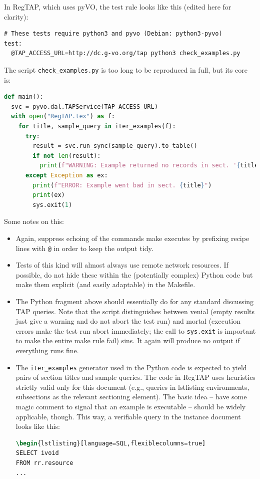 \documentclass[11pt,a4paper]{ivoa}
\begin{document}
In RegTAP, which uses pyVO, the test rule looks like this 
(edited here for clarity):

\begin{lstlisting}[basicstyle=\footnotesize]
# These tests require python3 and pyvo (Debian: python3-pyvo)
test:
  @TAP_ACCESS_URL=http://dc.g-vo.org/tap python3 check_examples.py
\end{lstlisting}

The script \verb|check_examples.py| is too long to be reproduced in
full, but its core is:

\begin{lstlisting}[language=python,basicstyle=\footnotesize]
def main():
  svc = pyvo.dal.TAPService(TAP_ACCESS_URL)
  with open("RegTAP.tex") as f:
    for title, sample_query in iter_examples(f):
      try:
        result = svc.run_sync(sample_query).to_table()
        if not len(result):
          print(f"WARNING: Example returned no records in sect. '{title}'")
      except Exception as ex:
        print(f"ERROR: Example went bad in sect. {title}")
        print(ex)
        sys.exit(1)
\end{lstlisting}

Some notes on this:

\begin{itemize}
\item Again, suppress echoing of the commands make executes by prefixing recipe
lines with \verb|@| in order to keep the output tidy.

\item Tests of this kind will almost always use remote network
resources.  If possible, do not hide these within the (potentially
complex) Python code but make them explicit (and easily adaptable) in
the Makefile.

\item The Python fragment above should essentially do for any standard
discussing TAP queries. Note that the script distinguishes between
venial (empty results just give a warning and do not abort the
test run) and mortal (execution errors make the test run abort
immediately; the call to \verb|sys.exit| is important to make the entire
make rule fail) sins. It again will produce no output if everything runs
fine.

\item The \verb|iter_examples| generator used in the Python code is expected
to yield pairs of section titles and sample queries.  The code in RegTAP
uses heuristics strictly valid only for this document (e.g., queries in
lstlisting environments, subsections as the relevant sectioning
element).  The basic idea -- have some magic comment to signal that an
example is executable -- should be widely applicable, though.  
This way, a verifiable query in the instance document looks like
this:
\begin{lstlisting}[language=tex,basicstyle=\footnotesize]
%CHECK_HERE
\begin{lstlisting}[language=SQL,flexiblecolumns=true]
SELECT ivoid 
FROM rr.resource
...
\end{lstlisting}

\end{itemize}
\end{document}

